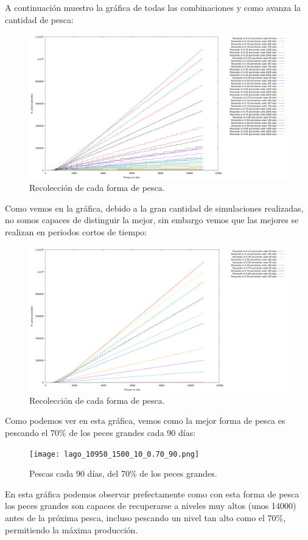 \documentclass[12pt, spanish]{article}
\begin{document}
A continuación muestro la gráfica de todas las combinaciones y como avanza la cantidad de pesca:


\begin{figure}[H]
	\centering
	\includegraphics[scale = 0.25]{total.png}
	\caption{Recolección de cada forma de pesca.}
	\label{fig:ej4}
\end{figure}


Como vemos en la gráfica, debido a la gran cantidad de simulaciones realizadas, no somos capaces de distinguir la mejor, sin embargo vemos que las mejores se realizan en periodos cortos de tiempo:


\begin{figure}[H]
	\centering
	\includegraphics[scale = 0.25]{total_reducido.png}
	\caption{Recolección de cada forma de pesca.}
	\label{fig:ej4}
\end{figure}


Como podemos ver en esta gráfica, vemos como la mejor forma de pesca es pescando el 70\% de los peces grandes cada 90 días:


\begin{figure}[H]
	\centering
	\texttt{[image: lago\_10950\_1500\_10\_0.70\_90.png]}
	\caption{Pescas cada 90 días, del 70\% de los peces grandes.}
	\label{fig:ej4}
\end{figure}

En esta gráfica podemos observar prefectamente como con esta forma de pesca los peces grandes son capaces de recuperarse a niveles muy altos (unos 14000) antes de la próxima pesca, incluso pescando un nivel tan alto como el 70\%, permitiendo la máxima producción.



%
%
\end{document}
